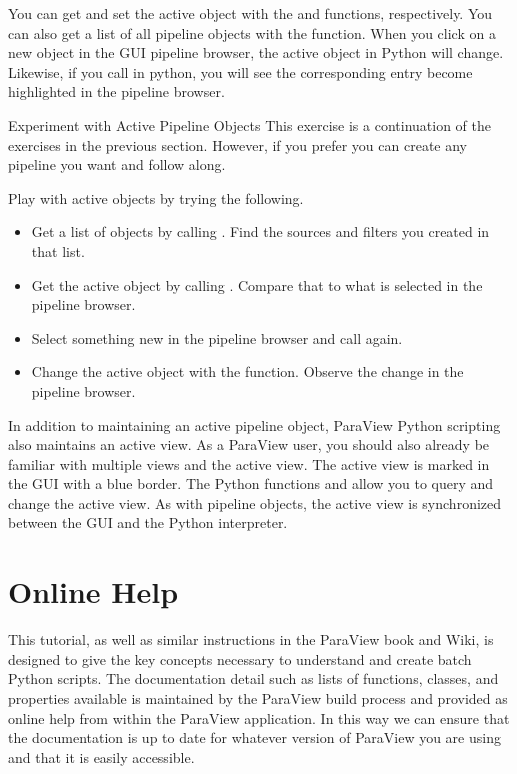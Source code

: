 You can get and set the active object with the  and
 functions, respectively.  You can also get a list
of all pipeline objects with the  function.  When you
click on a new object in the GUI pipeline browser, the active object in
Python will change.  Likewise, if you call  in
python, you will see the corresponding entry become highlighted in the
pipeline browser.

\begin{exercise}{Experiment with Active Pipeline Objects}
  \label{ex:ExperimentWithActivePipelineObjects}%
  This exercise is a continuation of the exercises in the previous
  section.  However, if you prefer you can create any pipeline you want and
  follow along.

  Play with active objects by trying the following.
  \begin{itemize}
  \item Get a list of objects by calling
    .  Find the sources and
    filters you created in that list.
  \item Get the active object by calling
    .  Compare that
    to what is selected in the pipeline browser.
  \item Select something new in the pipeline browser and call
     again.
  \item Change the active object with the 
    function.  Observe the change in the pipeline browser.
  \end{itemize}
\end{exercise}

In addition to maintaining an active pipeline object, ParaView Python
scripting also maintains an active view.  As a ParaView user, you should
also already be familiar with multiple views and the active view.  The
active view is marked in the GUI with a blue border.  The Python functions
 and  allow you to query and
change the active view.  As with pipeline objects, the active view is
synchronized between the GUI and the Python interpreter.


\section{Online Help}
\label{sec:OnlineHelp}

This tutorial, as well as similar instructions in the ParaView book and
Wiki, is designed to give the key concepts necessary to understand and
create batch Python scripts.  The documentation detail such as lists of
functions, classes, and properties available is maintained by the ParaView
build process and provided as online help from within the ParaView
application.  In this way we can ensure that the documentation is up to
date for whatever version of ParaView you are using and that it is easily
accessible.


